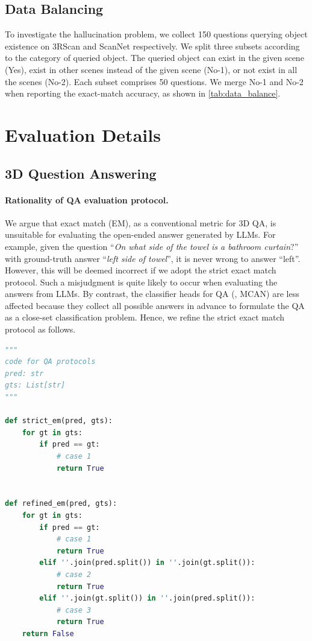 \subsection{Data Balancing}\label{sec:data_balancing}
To investigate the hallucination problem, we collect 150 questions querying object existence on 3RScan and ScanNet respectively. We split three subsets according to the category of queried object. The queried object can exist in the given scene (Yes),
exist in other scenes instead of the given scene (No-1), or not exist in all the scenes (No-2).
Each subset comprises 50 questions. We merge No-1 and No-2 when reporting the exact-match accuracy, as shown in \cref{tab:data_balance}.

\section{Evaluation Details}

\subsection{3D Question Answering}\label{sec:supp_eval_qa}
\paragraph{Rationality of QA evaluation protocol.} We argue that exact match (EM), as a conventional metric for 3D QA, is unsuitable for evaluating the open-ended answer generated by LLMs. For example, given the question ``\textit{On what side of the towel is a bathroom curtain}?'' with ground-truth answer ``\textit{left side of towel}'', it is never wrong to answer ``left''. However, this will be deemed incorrect if we adopt the strict exact match protocol. Such a misjudgment is quite likely to occur when evaluating the answers from LLMs. By contrast, the classifier heads for QA (\eg, MCAN) are less affected because they collect all possible answers in advance to formulate the QA as a close-set classification problem. Hence, we refine the strict exact match protocol as follows.

\begin{lstlisting}[language=Python]
"""
code for QA protocols
pred: str
gts: List[str]
"""

def strict_em(pred, gts):
    for gt in gts:
        if pred == gt:
            # case 1
            return True


def refined_em(pred, gts):
    for gt in gts:
        if pred == gt:
            # case 1
            return True
        elif ''.join(pred.split()) in ''.join(gt.split()):
            # case 2
            return True
        elif ''.join(gt.split()) in ''.join(pred.split()):
            # case 3
            return True
    return False
\end{lstlisting}

